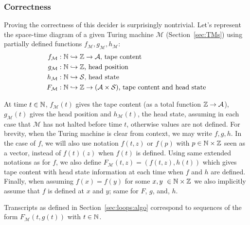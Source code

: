\subsubsection{Correctness}
Proving the correctness of this decider is surprisingly nontrivial. Let's represent the space-time diagram of a given Turing machine $\mathcal{M}$ (Section~\ref{sec:TMs}) using partially defined functions $f_\mathcal{M},g_\mathcal{M},h_\mathcal{M}$:
\begin{align*}
    f_\mathcal{M} & : \mathbb{N} \hookrightarrow \mathbb{Z} \to \mathcal{A}\text{, tape content}                                \\
    g_\mathcal{M} & : \mathbb{N} \hookrightarrow \mathbb{Z}\text{, head position}                                             \\
    h_\mathcal{M} & : \mathbb{N} \hookrightarrow \mathcal{S}\text{, head state}                                           \\
    F_\mathcal{M} & : \mathbb{N} \hookrightarrow \mathbb{Z} \to (\mathcal{A}\times \mathcal{S})\text{, tape content and head state}
\end{align*}

\newcommand{\baref}{F}

At time $t\in\mathbb{N}$, $f_\mathcal{M}(t)$ gives the tape content (as a total function $\mathbb{Z} \to \mathcal{A}$), $g_\mathcal{M}(t)$ gives the head position and $h_\mathcal{M}(t)$, the head state, assuming in each case that $\mathcal{M}$ has not halted before time $t$, otherwise values are not defined. For brevity, when the Turing machine is clear from context, we may write $f,g,h$. In the case of $f$, we will also use notation $f(t,z)$ or $f(p)$ with $p \in \mathbb{N} \times \mathbb{Z}$ seen as a vector, instead of $f(t)(z)$ when $f(t)$ is defined. Using same extended notations as for $f$, we also define $\baref_\mathcal{M}(t,z) = (f(t,z),h(t))$ which gives tape content with head state information at each time when $f$ and $h$ are defined.
Finally, when assuming $f(x) = f(y)$ for some $x,y \in \N \times \Z$ we also implicitly assume that $f$ is defined at $x$ and $y$; same for $\baref$, $g$, and, $h$.

Transcripts as defined in Section~\ref{sec:loops:algo} correspond to sequences of the form $F_\mathcal{M}(t,g(t))$ with $t\in\mathbb{N}$.

